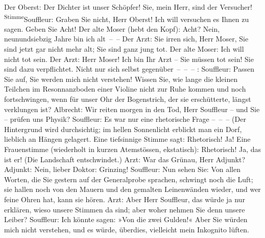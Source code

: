\begin{ledgroupsized}[t]{13cm}
           Der Oberst: Der Dichter ist unser Schöpfer! Sie, mein Herr, sind der
					Versucher!\pend
           \pstart
           \substVorne{}\textsuperscript{Stimme}{\allowbreak}\substDazwischen{}Souffleur\substHinten{}: Graben Sie nicht, Herr Oberst! Ich will versuchen es Ihnen zu sagen.
					Geben Sie Acht!\pend
           \pstart
           Der alte Moser (hebt den Kopf): Acht? Nein, neunundsiebzig Jahre bin ich
					alt – –\pend
           \pstart
           Der Arzt: Sie irren sich, Herr Moser, Sie sind jetzt gar nicht mehr alt; Sie sind
					ganz jung tot.\pend
           \pstart
           Der alte Moser: Ich will nicht tot sein.\pend
           \pstart
           Der Arzt: Herr Moser! Ich bin Ihr Arzt – Sie müssen tot sein! Sie sind dazu
					verpflichtet. Nicht nur sich selbst gegenüber – – –\pend
           \pstart
           \introOben{}: \introOben{}Souffleur: Passen Sie auf, Sie
					werden mich nicht verstehen! Wissen Sie, wie lange die kleinen Teilchen im
					Resonnanzboden einer Violine nicht zur Ruhe kommen und noch
					fortschwingen, wenn für unser Ohr der Bogenstrich, der sie erschütterte, längst
					verklungen ist?\pend
           \pstart
           Albrecht: Wir reiten morgen in den Tod, Herr Souffleur – und Sie – prüfen uns
					Physik?\pend
           \pstart
           {\pb}Souffleur: Es war nur eine
					rhetorische Frage – – –\pend
           \pstart
           (Der Hintergrund wird durchsichtig; im hellen Sonnenlicht erblickt man ein Dorf,
					lieblich an Hängen gelagert. Eine tiefsinnige Stimme sagt:\pend
           \pstart
           Rhetorisch! Ja!\pend
           \pstart
           Eine Frauenstimme (wiederholt in kurzen Atemstössen, ekstatisch): Rhetorisch! Ja,
					das ist er!\pend
           \pstart
           (Die Landschaft entschwindet.)\pend
           \pstart
           Arzt: War das Grünau, Herr Adjunkt?\pend
           \pstart
           Adjunkt: Nein, lieber Doktor: Grinzing!\pend
           \pstart
           Souffleur: Nun sehen Sie: Von allen Worten, die Sie gestern auf der Generalprobe
					sprachen, schwingt noch die Luft; sie hallen noch von den Mauern und den
					gemalten Leinenwänden wieder, und wer feine Ohren hat, kann sie hören.\pend
           \pstart
           Arzt: Aber Herr Souffleur, das würde ja nur erklären, wieso unsere Stimmen da
					sind; aber woher nehmen Sie denn unsere Leiber?\pend
           \pstart
           Souffleur: Ich könnte sagen: »Von die zwei Gulden!« Aber Sie würden mich nicht
					verstehen, und es würde, überdies, vielleicht mein Inkognito lüften.\pend

\end{ledgroupsized}
